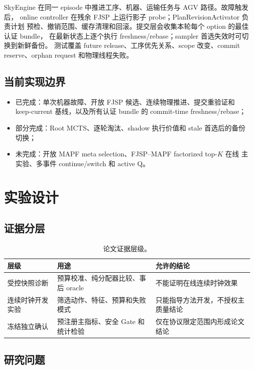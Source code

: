 \documentclass[11pt,a4paper]{article}
\begin{document}
SkyEngine 在同一 episode 中推进工序、机器、运输任务与 AGV 路径。故障触发后，
online controller 在残余 FJSP 上运行影子 probe；PlanRevisionActivator 负责计划
预检、撤销范围、缓存清理和回滚。提交层会收集本轮每个 option 的最佳认证 bundle，
在最新状态上逐个执行 freshness/rebase；sampler 首选失效时可切换到新鲜备份。
测试覆盖 future release、工序优先关系、scope 改变、commit reserve、orphan request
和物理线程失败。

\subsection{当前实现边界}

\begin{itemize}
    \item 已完成：单次机器故障、开放 FJSP 候选、连续物理推进、提交重验证和
    keep-current 基线，以及所有认证 bundle 的 commit-time freshness/rebase；
    \item 部分完成：Root MCTS、逐轮淘汰、shadow 执行价值和 stale 首选后的备份切换；
    \item 未完成：开放 MAPF meta selection、FJSP--MAPF factorized top-\(K\) 在线
    主实验、多事件 continue/switch 和 active Q。
\end{itemize}

\section{实验设计}
\label{sec:experiments}

\subsection{证据分层}

\begin{table}[t]
\centering
\caption{论文证据层级。}
\label{tab:evidence}
\begin{tabular}{P{25mm}P{42mm}P{63mm}}
\toprule
层级 & 用途 & 允许的结论 \\
\midrule
受控快照诊断 &
预算校准、纯分配器比较、事后 oracle &
不能证明在线连续时钟效果 \\
连续时钟开发实验 &
筛选动作、特征、预算和失败模式 &
只能指导方法开发，不授权主质量结论 \\
冻结独立确认 &
预注册主指标、安全 Gate 和统计检验 &
仅在协议限定范围内形成论文结论 \\
\bottomrule
\end{tabular}
\end{table}

\subsection{研究问题}
\end{document}
